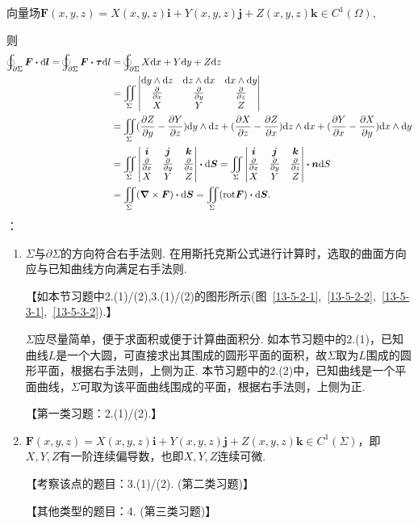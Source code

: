 \documentclass[12pt,UTF8,fleqn]{ctexart}
\newcommand{\BLOInt}[2]{\varoint\nolimits_{#1}#2}
\newcommand{\md}[1]{\mathrm d#1}
\newcommand{\BSIInt}[2]{\iint\limits_{#1}#2}
\newcommand{\pp}[2]{\frac{\partial #1}{\partial #2}}
\newcommand{\ppx}[1]{\frac{\partial #1}{\partial x}}
\newcommand{\ppy}[1]{\frac{\partial #1}{\partial y}}
\newcommand{\ppz}[1]{\frac{\partial #1}{\partial z}}
\begin{document}
\begin{enumerate}
向量场$\bm F(x,y,z)=X(x,y,z)\bm i+Y(x,y,z)\bm j+Z(x,y,z)\bm k\in C^1(\Omega)$,

则
\[\begin{aligned}
\BLOInt{\partial\Sigma}{\bm F\bm\cdot\md\bm l}=\BLOInt{\partial\Sigma}{\bm F\bm\cdot\bm\tau\md l}&=\BLOInt{\partial\Sigma}{X\md x+Y\md y+Z\md z}\\
&=\BSIInt\Sigma{\begin{vmatrix}
\md y\wedge\md z&\md z\wedge\md x&\md x\wedge\md y\\
\ppx{}&\ppy{}&\ppz{}\\
X&Y&Z
\end{vmatrix}}\\
&=\BSIInt\Sigma{(\pp Zy-\pp Yz)\md y\wedge\md z+(\pp Xz-\pp Zx)\md z\wedge\md x+(\pp Yx-\pp Xy)\md x\wedge\md y}\\
&=\BSIInt\Sigma{\begin{vmatrix}
\bm i&\bm j&\bm k\\
\ppx{}&\ppy{}&\ppz{}\\
X&Y&Z
\end{vmatrix}\bm\cdot\md\bm S}=\BSIInt\Sigma{\begin{vmatrix}
\bm i&\bm j&\bm k\\
\ppx{}&\ppy{}&\ppz{}\\
X&Y&Z
\end{vmatrix}\bm\cdot\bm n\md S}\\
&=\BSIInt\Sigma{(\bm\nabla\times\bm F)\bm\cdot\md\bm S}=\BSIInt\Sigma{(\text{rot}\bm F)\bm\cdot\md\bm S}.
\end{aligned}\]
{：}
\begin{enumerate}
\item$\Sigma$与$\partial\Sigma$的方向符合右手法则. 在用斯托克斯公式进行计算时，选取的曲面方向应与已知曲线方向满足右手法则.

【如本节习题中2.(1)/(2),3.(1)/(2)的图形所示(图~\ref{13-5-2-1},~\ref{13-5-2-2},~\ref{13-5-3-1},~\ref{13-5-3-2}).】

$\Sigma$应尽量简单，便于求面积或便于计算曲面积分. 如本节习题中的2.(1)，已知曲线$L$是一个大圆，可直接求出其围成的圆形平面的面积，故$\Sigma$取为$L$围成的圆形平面，根据右手法则，上侧为正. 本节习题中的2.(2)中，已知曲线是一个平面曲线，$\Sigma$可取为该平面曲线围成的平面，根据右手法则，上侧为正.

【第一类习题：2.(1)/(2).】
\item$\bm F(x,y,z)=X(x,y,z)\bm i+Y(x,y,z)\bm j+Z(x,y,z)\bm k\in C^1(\Sigma)$，即$X,Y,Z$有一阶连续偏导数，也即$X,Y,Z$连续可微.

【考察该点的题目：3.(1)/(2). (第二类习题)】

【其他类型的题目：4. (第三类习题)】
\end{enumerate}
\end{enumerate}
\end{document}
